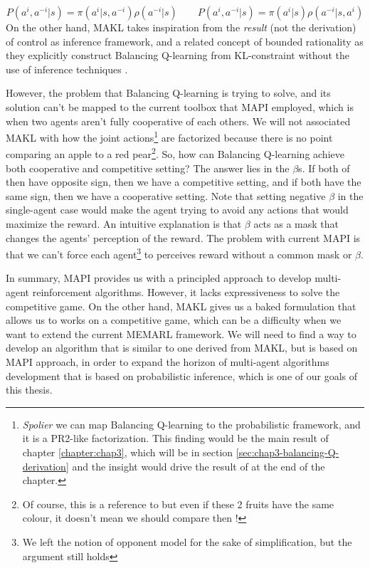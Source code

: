 \begin{equation}
\label{eqn:chap1-factorize-PR2-ROMMEO}
    P(a^{i}, a^{-i} | s) = \pi(a^{i} | s, a^{-i}) \rho(a^{-i} | s) \qquad P(a^{i}, a^{-i} | s) = \pi(a^{i} | s) \rho(a^{-i} | s, a^{i})
\end{equation}
On the other hand, MAKL takes inspiration from the \textit{result} (not the derivation) of control as inference framework, and a related concept of bounded rationality as they explicitly construct Balancing Q-learning from KL-constraint without the use of inference techniques \cite{grau2018balancing}. 

However, the problem that Balancing Q-learning is trying to solve, and its solution can't be mapped to the current toolbox that MAPI employed, which is when two agents aren't fully cooperative of each others. We will not associated MAKL with how the joint actions\footnote{\textit{Spolier} we can map Balancing Q-learning to the probabilistic framework, and it is a PR2-like factorization. This finding would be the main result of chapter \ref{chapter:chap3}, which will be in section \ref{sec:chap3-balancing-Q-derivation} and the insight would drive the result of at the end of the chapter.} are factorized because there is no point comparing an apple to a red pear\footnote{Of course, this is a reference to  but even if these 2 fruits have the same colour, it doesn't mean we should compare then !}. So, how can Balancing Q-learning achieve both cooperative and competitive setting? The answer lies in the $\beta$s. If both of then have opposite sign, then we have a competitive setting, and if both have the same sign, then we have a cooperative setting. Note that setting negative $\beta$ in the single-agent case would make the agent trying to avoid any actions that would maximize the reward. An intuitive explanation is that $\beta$ acts as a mask that changes the agents' perception of the reward. The problem with current MAPI is that we can't force each agent\footnote{We left the notion of opponent model for the sake of simplification, but the argument still holds} to perceives reward without a common mask or $\beta$. 

In summary, MAPI provides us with a principled approach to develop multi-agent reinforcement algorithms. However, it lacks expressiveness to solve the competitive game. On the other hand, MAKL gives us a baked formulation that allows us to works on a competitive game, which can be a difficulty when we want to extend the current MEMARL framework. We will need to find a way to develop an algorithm that is similar to one derived from MAKL, but is based on MAPI approach, in order to expand the horizon of multi-agent algorithms development that is based on probabilistic inference, which is one of our goals of this thesis.

